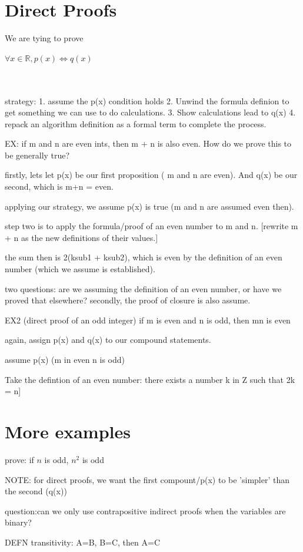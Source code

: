 \documentclass{article}
\begin{document}
\section{Direct Proofs}

We are tying to prove 

$\forall x \in \mathbb{R}, p(x) \iff q(x)$

\\ \\ 

strategy:
1. assume the p(x) condition holds
2. Unwind the formula definion to get something we can use to do
calculations.
3. Show calculations lead to q(x)
4. repack an algorithm definition as a formal term to complete the process.

EX: if m and n are even ints, then m + n is also even.
How do we prove this to be generally true?

firstly, lets let p(x) be our first proposition ( m and n are even).
And q(x) be our second, which is m+n = even.

applying our strategy, we assume p(x) is true (m and n are assumed even then).

step two is to apply the formula/proof of an even number to m and n.
[rewrite m + n as the new definitions of their values.]

the sum then is 2(ksub1 + ksub2), which is even by the definition of an even number (which we assume is established).

{two questions: are we assuming the definition of an even number, or have we proved that elsewhere? secondly, the proof of closure is also assume.}

EX2 (direct proof of an odd integer)
if m is even and n is odd, then mn is even

again, assign p(x) and q(x) to our compound statements.

assume p(x) (m in even n is odd)



Take the defintion of an even number:
there exists a number k in Z such that 2k = n]

\section{More examples}

prove: if $n$ is odd, $n^2$ is odd

NOTE: for direct proofs, we want the first compount/p(x) to be 'simpler' than the second (q(x))

question:{can we only use contrapositive indirect proofs when the variables are binary?}

DEFN transitivity: A=B, B=C, then A=C
\end{document}
